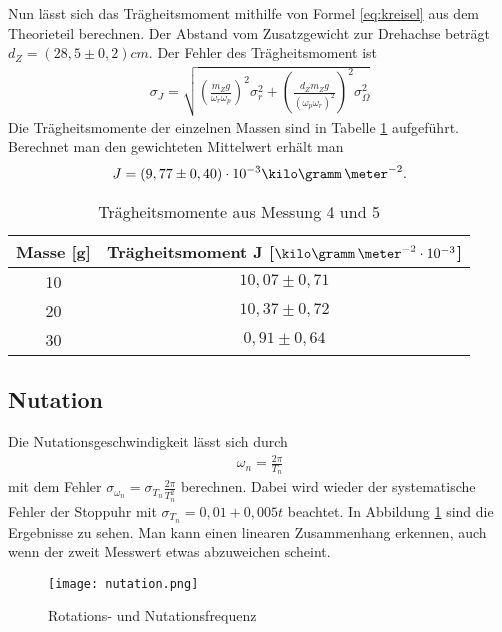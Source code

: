 \documentclass[12pt, a4paper, twoside]{scrartcl}
\begin{document}
Nun lässt sich das Trägheitsmoment mithilfe von Formel \ref{eq:kreisel} aus dem Theorieteil berechnen. Der Abstand vom Zusatzgewicht zur Drehachse beträgt $d_Z=\left(28,5\pm0,2\right)cm$. Der Fehler des Trägheitsmoment ist
\begin{align*}
\sigma_J=\sqrt{\left(\frac{m_Zg}{\omega_r\omega_p}\right)^2\sigma_r^2+\left(\frac{d_Zm_Zg}{(\omega_p\omega_r)^2}\right)^2\sigma_\Omega^2}
\end{align*}
Die Trägheitsmomente der einzelnen Massen sind in Tabelle \ref{tab:kreisel} aufgeführt. Berechnet man den gewichteten Mittelwert erhält man
\begin{align*}
J=\left(9,77\pm0,40\right)\cdot10^{-3}\kilo\gramm\,\meter^{-2}.
\end{align*}



\renewcommand{\arraystretch}{1.0}
\begin{table}[H]
\centering
\begin{tabular}{|c|c|}
	\hline
    Masse [g] & Trägheitsmoment J [$\kilo\gramm\,\meter^{-2}\cdot10^{-3}$]  \\
    \hline\hline
     10 & $10,07\pm0,71$  \\
     20 & $10,37\pm0,72$  \\
     30 & $0,91\pm0,64$  \\
    \hline
 \end{tabular} 
 \caption{\label{tab:kreisel}Trägheitsmomente aus Messung 4 und 5}
\end{table}

\subsection{Nutation}
Die Nutationsgeschwindigkeit lässt sich durch
\begin{align*}
\omega_n=\frac{2\pi}{T_n}
\end{align*}
mit dem Fehler $\sigma_{\omega_n}=\sigma_{T_n}\frac{2\pi}{T_n^2}$ berechnen. Dabei wird wieder der systematische Fehler der Stoppuhr mit $\sigma_{T_n}=0,01+0,005t$ beachtet. In Abbildung \ref{fig:nutation} sind die Ergebnisse zu sehen. Man kann einen linearen Zusammenhang erkennen, auch wenn der zweit Messwert etwas abzuweichen scheint.

\begin{figure} [H]
\centering
\texttt{[image: nutation.png]}
\caption{\label{fig:nutation}Rotations- und Nutationsfrequenz}
\end{figure}
\end{document}
